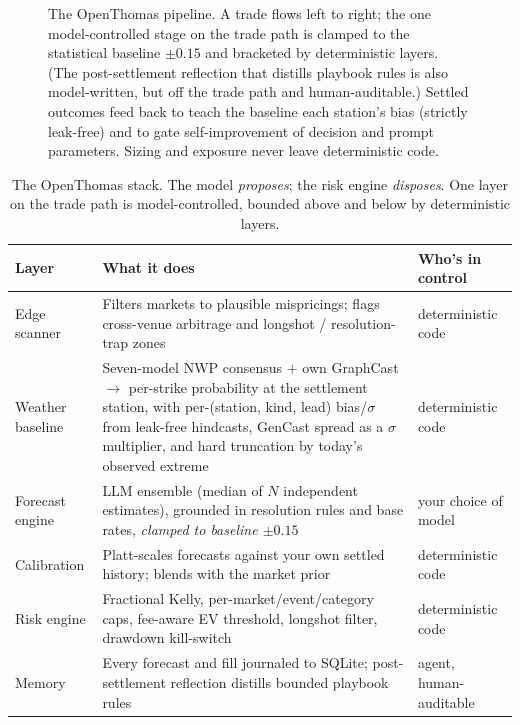 \documentclass[sigconf,review,anonymous]{acmart}
\begin{document}
\begin{figure}[t]
\caption{The OpenThomas pipeline. A trade flows left to right; the one
model-controlled stage on the trade path is clamped to the statistical baseline
$\pm 0.15$ and bracketed by deterministic layers. (The post-settlement
reflection that distills playbook rules is also model-written, but off the
trade path and human-auditable.) Settled outcomes feed back to teach the
baseline each station's bias (strictly leak-free) and to gate self-improvement
of decision and prompt parameters. Sizing and exposure never leave
deterministic code.}
\label{fig:pipeline}
\end{figure}

\begin{table}[t]
\centering
\small
\begin{tabular}{@{}p{2.4cm}p{10.2cm}p{2.9cm}@{}}
\toprule
\textbf{Layer} & \textbf{What it does} & \textbf{Who's in control} \\
\midrule
Edge scanner & Filters markets to plausible mispricings; flags cross-venue arbitrage and longshot / resolution-trap zones & deterministic code \\
Weather baseline & Seven-model NWP consensus $+$ own GraphCast $\to$ per-strike probability at the settlement station, with per-(station, kind, lead) bias/$\sigma$ from leak-free hindcasts, GenCast spread as a $\sigma$ multiplier, and hard truncation by today's observed extreme & deterministic code \\
Forecast engine & LLM ensemble (median of $N$ independent estimates), grounded in resolution rules and base rates, \emph{clamped to baseline $\pm 0.15$} & your choice of model \\
Calibration & Platt-scales forecasts against your own settled history; blends with the market prior & deterministic code \\
Risk engine & Fractional Kelly, per-market/event/category caps, fee-aware EV threshold, longshot filter, drawdown kill-switch & deterministic code \\
Memory & Every forecast and fill journaled to SQLite; post-settlement reflection distills bounded playbook rules & agent, human-auditable \\
\bottomrule
\end{tabular}
\caption{The OpenThomas stack. The model \emph{proposes}; the risk engine
\emph{disposes}. One layer on the trade path is model-controlled, bounded
above and below by deterministic layers.}
\label{tab:layers}
\end{table}
\end{document}
